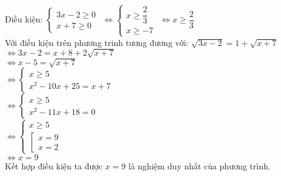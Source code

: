 \begin{Answer}{4}
    Điều kiện: $ \begin{cases}
        3x -2 \geq 0 \\
        x + 7 \geq 0
    \end{cases} $
    $
    \Leftrightarrow
    \begin{cases}
        x \geq \dfrac{2}{3 } \\
        x \geq -7
    \end{cases} $
    $
    \Leftrightarrow
        x \geq \dfrac{2}{3 } $ \\

    Với điều kiện trên phương trinh tương đương với:
    $ \sqrt{3x -2 } = 1 + \sqrt{x+7}  $ \\
    $ \Leftrightarrow 3x -2 = x+8 + 2 \sqrt{x+7 }  $ \\
    $ \Leftrightarrow x -5 = \sqrt{x+7} $ \\
    $ \Leftrightarrow \begin{cases}
        x \geq 5 \\
        x^2 -10x + 25 = x +7
    \end{cases} $ \\
    $ \Leftrightarrow \begin{cases}
        x \geq 5 \\
        x^2 -11x + 18 =0
    \end{cases} $ \\
    $ \Leftrightarrow \begin{cases}
        x \geq 5 \\
        \left[
            \begin{array}{l}
                x=9 \\
                x=2
            \end{array}
        \right.
    \end{cases} $ \\
    $ \Leftrightarrow x=9 $ \\
    Kết hợp điều kiện ta được $ x=9 $ là nghiệm duy nhất của phương trình.
\end{Answer}
